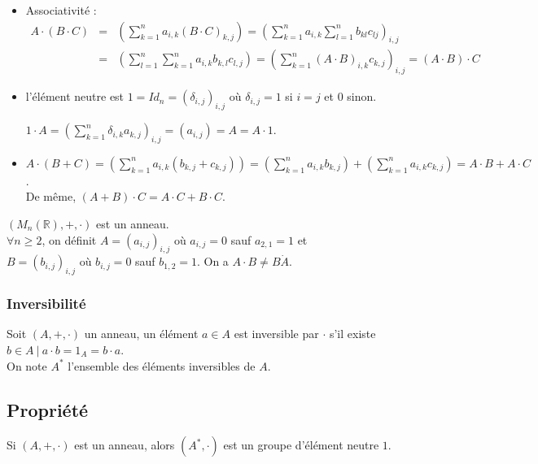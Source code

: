 \documentclass[a4paper,10pt]{book} %
\newcommand{\R}{\mathbb{R}}
\newcommand{\tq}{~|~}
\begin{document}
\begin{enumerate}
\begin{itemize}
\item Associativité :
$\begin{array}{rcl} A\cdot (B\cdot C)&=& \displaystyle(\sum_{k=1}^na_{i,k}(B\cdot C)_{k,j})
=(\sum_{k=1}^na_{i,k}\sum_{l=1}^nb_{kl}c_{lj})_{i,j}\\&=&\displaystyle(\sum_{l=1}^n\sum_{k=1}^na_{i,k}b_{k,l}c_{l,j})= (\sum_{k=1}^n(A\cdot B)_{i,k}c_{k,j})_{i,j}=(A\cdot B)\cdot C\end{array}$\\

\item l'élément neutre est $1=Id_n=(\delta_{i,j})_{i,j}$ où $\delta_{i,j}=1$ si $i=j$ et 0 sinon.

$\displaystyle1\cdot A=(\sum_{k=1}^n\delta_{i,k}a_{k,j})_{i,j} =(a_{i,j}) =A=A\cdot 1$.

\item $\displaystyle A\cdot (B+C)=(\sum_{k=1}^na_{i,k}(b_{k,j}+c_{k,j}))=(\sum_{k=1}^na_{i,k}b_{k,j})+(\sum_{k=1}^na_{i,k}c_{k,j})=A\cdot B+A\cdot C$.\\
De même, $(A+B)\cdot C=A\cdot C+B\cdot C$.
\end{itemize}
$(M_n(\R),+,\cdot)$ est un anneau.\\

$\forall n\geq 2$, on définit $A=(a_{i,j})_{i,j}$ où $a_{i,j}=0$ sauf $a_{2,1}=1$ et\\$B=(b_{i,j})_{i,j}$ où $b_{i,j}=0$ sauf $b_{1,2}=1$.
On a $A\cdot B\neq B\dot A$.
\end{enumerate}
\bigskip

\subsubsection{Inversibilité}
Soit $(A,+,\cdot)$ un anneau, un élément $a\in A$ est inversible par $\cdot$ s'il existe $b\in A \tq a\cdot b=1_A=b\cdot a$.\\

On note $A^*$ l'ensemble des éléments inversibles de $A$.

\subsection{Propriété}
Si $(A,+,\cdot)$ est un anneau, alors $(A^*, \cdot)$ est un groupe d'élément neutre $1$.
\end{document}
